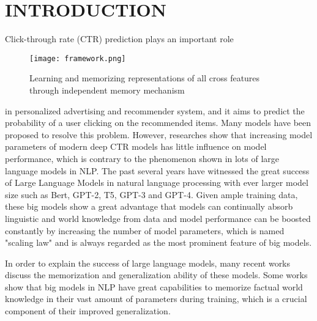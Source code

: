 \documentclass[sigconf,authorversion]{acmart}
\begin{document}









\maketitle



\section{INTRODUCTION}

Click-through rate (CTR) prediction plays an important role 
\begin{figure}[h]
  \centering
\texttt{[image: framework.png]}
  \caption{Learning and memorizing representations of all cross features through independent memory mechanism}
  \Description{}
  \label{Fig.framework}
\end{figure}
in personalized advertising and recommender system, and it aims to 
predict the probability of a user clicking on the recommended items. 
Many models\cite{rendle2010factorization,pan2018field,nfm,xiao2017attentional,guo2017deepfm,wang2017deep,masknet} have been proposed to resolve this problem. However, researches\cite{HuangZZ19,lian2018xdeepfm,WangSCJLHC21} show that increasing model parameters of modern deep CTR models has little influence on model performance, which is contrary to the phenomenon shown in lots of large language models\cite{gpt4,xlnet,gpt3} in NLP. The past several years have witnessed the great success of Large Language Models\cite{xlnet,bert,gpt2,gpt3,t5,gpt4} in natural language processing with ever larger model size such as Bert\cite{bert}, GPT-2\cite{gpt2}, T5\cite{t5}, GPT-3\cite{gpt3} and GPT-4\cite{gpt4}. Given ample training data, these big models show a great advantage that models can continually absorb linguistic and world knowledge from data and model performance can be boosted constantly by increasing the number of model parameters, which is named "scaling law" and is always regarded as the most prominent feature of big models. 

In order to explain the success of large language models, many recent works\cite{carlini2022quantifying,tirumala2022memorization,zhu2020modifying,webson2021prompt} discuss the memorization and generalization ability of these models. Some works\cite{heinzerling2020language,wang2021language,magar2022data} show that big models in NLP have great capabilities to memorize factual world knowledge in their vast amount of parameters during training, which is a crucial component of their improved generalization.
\end{document}
